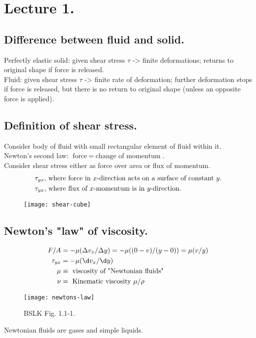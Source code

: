 \section{Lecture 1.}
\subsection{Difference between fluid and solid.}
Perfectly elastic solid: given shear stress $ \tau $ -> finite deformations; returns to original shape if force is released.\\
Fluid: given shear stress $ \tau $ -> finite rate of deformation; further deformation stops if force is released, but there is no return to original shape (unless an opposite force is applied).

\subsection{Definition of shear stress.}
Consider body of fluid with small rectangular element of fluid within it.\\
Newton's second law: $ \text{force} \ = \ \text{change of momentum} $.\\
Consider shear stress either as force over area or flux of momentum.
\begin{align*}
	\tau_{yx}, &\ \text{where force in $ x $-direction acts on a surface of constant $ y $.}\\
	\tau_{yx}, &\ \text{where flux of $ x $-momentum is in $ y $-direction.}
\end{align*}
\begin{figure}[H]
	\centering
	\texttt{[image: shear-cube]}
\end{figure}

\subsection{Newton's "law" of viscosity.}
\begin{align*}
	F/A &= -\mu(\Delta v_x / \Delta y) = -\mu((0-v)/(y-0)) = \mu(v/y)\\
	\tau_{yx} &= -\mu(\d v_x/\d y)\\
	\mu &\equiv \ \text{viscosity of "Newtonian fluids"}\\
	\nu &= \ \text{Kinematic viscosity} \ \mu/\rho
\end{align*}
\begin{figure}[H]
	\centering
	\texttt{[image: newtons-law]}
	\caption{BSLK Fig. 1.1-1.}
\end{figure}
Newtonian fluids are gases and simple liquids.


